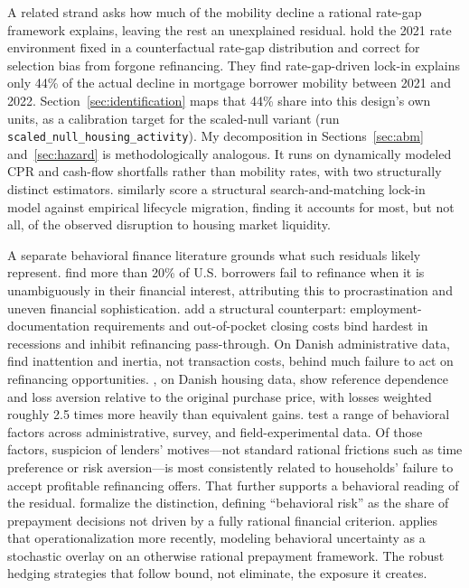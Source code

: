 \documentclass[12pt]{article}
\begin{document}
A related strand asks how much of the mobility decline a rational rate-gap framework explains, leaving the rest an unexplained residual. \citet{aladangady2024} hold the 2021 rate environment fixed in a counterfactual rate-gap distribution and correct for selection bias from forgone refinancing. They find rate-gap-driven lock-in explains only 44\% of the actual decline in mortgage borrower mobility between 2021 and 2022. Section~\ref{sec:identification} maps that 44\% share into this design's own units, as a calibration target for the scaled-null variant (run \texttt{scaled\_null\_housing\_activity}). My decomposition in Sections~\ref{sec:abm} and~\ref{sec:hazard} is methodologically analogous. It runs on dynamically modeled CPR and cash-flow shortfalls rather than mobility rates, with two structurally distinct estimators. \citet{gerardi2024} similarly score a structural search-and-matching lock-in model against empirical lifecycle migration, finding it accounts for most, but not all, of the observed disruption to housing market liquidity.

A separate behavioral finance literature grounds what such residuals likely represent. \citet{keys2016} find more than 20\% of U.S. borrowers fail to refinance when it is unambiguously in their financial interest, attributing this to procrastination and uneven financial sophistication. \citet{defusco2020} add a structural counterpart: employment-documentation requirements and out-of-pocket closing costs bind hardest in recessions and inhibit refinancing pass-through. On Danish administrative data, \citet{andersen2020} find inattention and inertia, not transaction costs, behind much failure to act on refinancing opportunities. \citet{andersen2022}, on Danish housing data, show reference dependence and loss aversion relative to the original purchase price, with losses weighted roughly 2.5 times more heavily than equivalent gains. \citet{johnson2019} test a range of behavioral factors across administrative, survey, and field-experimental data. Of those factors, suspicion of lenders' motives---not standard rational frictions such as time preference or risk aversion---is most consistently related to households' failure to accept profitable refinancing offers. That further supports a behavioral reading of the residual. \citet{bissiri2014} formalize the distinction, defining ``behavioral risk'' as the share of prepayment decisions not driven by a fully rational financial criterion. \citet{perotti2024} applies that operationalization more recently, modeling behavioral uncertainty as a stochastic overlay on an otherwise rational prepayment framework. The robust hedging strategies that follow bound, not eliminate, the exposure it creates.
\end{document}
